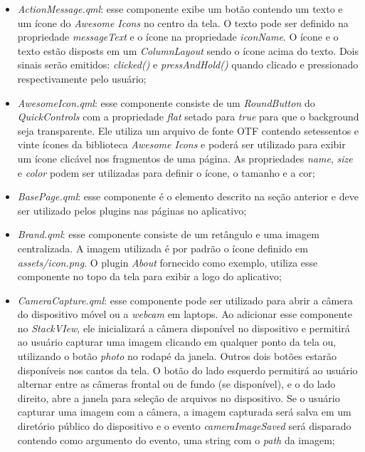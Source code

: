 \begin{itemize}
	\item \textit{ActionMessage.qml}: esse componente exibe um botão contendo um texto e um ícone do \textit{Awesome Icons} no centro da tela. O texto pode ser definido na propriedade \textit{messageText} e o ícone na propriedade \textit{iconName}. O ícone e o texto estão disposts em um \textit{ColumnLayout} sendo o ícone acima do texto. Dois sinais serão emitidos: \textit{clicked()} e \textit{pressAndHold()} quando clicado e pressionado respectivamente pelo usuário;

	\item \textit{AwesomeIcon.qml}: esse componente consiste de um \textit{RoundButton} do \textit{QuickControls} com a propriedade \textit{flat} setado para \textit{true} para que o background seja transparente. Ele utiliza um arquivo de fonte OTF contendo setessentos e vinte ícones da biblioteca \textit{Awesome Icons} e poderá ser utilizado para exibir um ícone clicável nos fragmentos de uma página. As propriedades \textit{name}, \textit{size} e \textit{color} podem ser utilizadas para definir o ícone, o tamanho e a cor;

	\item \textit{BasePage.qml}: esse componente é o elemento descrito na seção anterior e deve ser utilizado pelos plugins nas páginas no aplicativo;

	\item \textit{Brand.qml}: esse componente consiste de um retângulo e uma imagem centralizada. A imagem utilizada é por padrão o ícone definido em \textit{assets/icon.png}. O plugin \textit{About} fornecido como exemplo, utiliza esse componente no topo da tela para exibir a logo do aplicativo;

	\item \textit{CameraCapture.qml}: esse componente pode ser utilizado para abrir a câmera do dispositivo móvel ou a \textit{webcam} em laptops. Ao adicionar esse componente no \textit{StackVIew}, ele inicializará a câmera disponível no dispositivo e permitirá ao usuário capturar uma imagem clicando em qualquer ponto da tela ou, utilizando o botão \textit{photo} no rodapé da janela. Outros dois botões estarão disponíveis nos cantos da tela. O botão do lado esquerdo permitirá ao usuário alternar entre as câmeras frontal ou de fundo (se disponível), e o do lado direito, abre a janela para seleção de arquivos no dispositivo. Se o usuário capturar uma imagem com a câmera, a imagem capturada será salva em um diretório público do dispositivo e o evento \textit{cameraImageSaved} será disparado contendo como argumento do evento, uma string com o \textit{path} da imagem;


\end{itemize}
